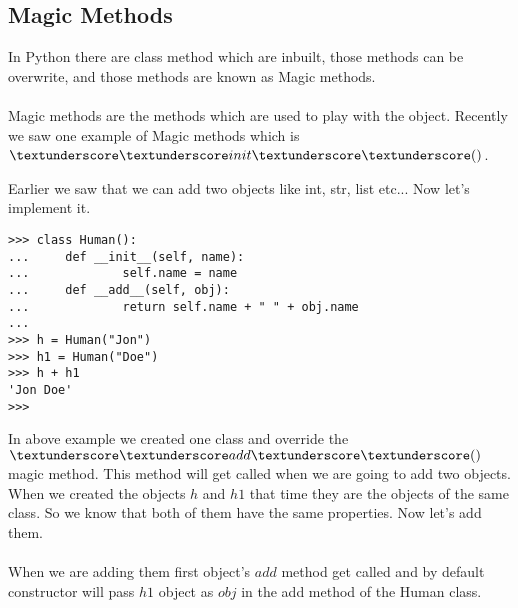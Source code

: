 \documentclass[letterpaper,12pt]{book}
\begin{document}
\subsection{Magic Methods}
In Python there are class method which are inbuilt, those methods can be overwrite, and those methods are known as Magic methods.
\paragraph{}
Magic methods are the methods which are used to play with the object. Recently we saw one example of Magic methods which is $\textunderscore\textunderscore init \textunderscore\textunderscore()$.

Earlier we saw that we can add two objects like int, str, list etc... Now let's implement it. 
\begin{verbatim}
>>> class Human():
...     def __init__(self, name):
...             self.name = name
...     def __add__(self, obj):
...             return self.name + " " + obj.name
... 
>>> h = Human("Jon")
>>> h1 = Human("Doe")
>>> h + h1
'Jon Doe'
>>> 
\end{verbatim} 
In above example we created one class and override the $\textunderscore\textunderscore add \textunderscore\textunderscore()$ magic method. This method will get called when we are going to add two objects. When we created the objects $h$ and $h1$ that time they are the objects of the same class. So we know that both of them have the same properties. Now let's add them. 

\paragraph{}
When we are adding them first object's $add$ method get called and by default constructor will pass $h1$ object as $obj$ in the add method of the Human class.
\end{document}
